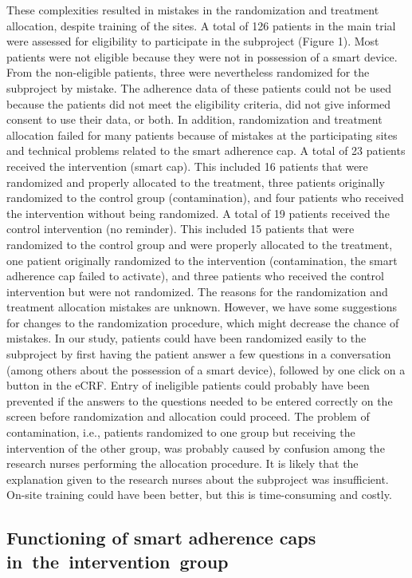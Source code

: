 \documentclass[twocolumn, issue, empirical, authordate]{jote-new-article}
\begin{document}
 These complexities resulted in mistakes in the randomization and treatment allocation, despite training of the sites. A total of 126 patients in the main trial were assessed for eligibility to participate in the subproject (Figure 1). Most patients were not eligible because they were not in possession of a smart device. From the non-eligible patients, three were nevertheless randomized for the subproject by mistake. The adherence data of these patients could not be used because the patients did not meet the eligibility criteria, did not give informed consent to use their data, or both.
 In addition, randomization and treatment allocation failed for many patients because of mistakes at the participating sites and technical problems related to the smart adherence cap. A total of 23 patients received the intervention (smart cap). This included 16 patients that were randomized and properly allocated to the treatment, three patients originally randomized to the control group (contamination), and four patients who received the intervention without being randomized. A total of 19 patients received the control intervention (no reminder). This included 15 patients that were randomized to the control group and were properly allocated to the treatment, one patient originally randomized to the intervention (contamination, the smart adherence cap failed to activate), and three patients who received the control intervention but were not randomized.
 The reasons for the randomization and treatment allocation mistakes are unknown. However, we have some suggestions for changes to the randomization procedure, which might decrease the chance of mistakes. In our study, patients could have been randomized easily to the subproject by first having the patient answer a few questions in a conversation (among others about the possession of a smart device), followed by one click on a button in the eCRF. Entry of ineligible patients could probably have been prevented if the answers to the questions needed to be entered correctly on the screen before randomization and allocation could proceed.
 The problem of contamination, i.e., patients randomized to one group but receiving the intervention of the other group, was probably caused by confusion among the research nurses performing the allocation procedure.
It is likely that the explanation given to the research nurses about the subproject was insufficient. On-site training could have been better, but this is time-consuming and costly.


\subsection{Functioning of smart adherence caps in~the~intervention~group}
\end{document}
